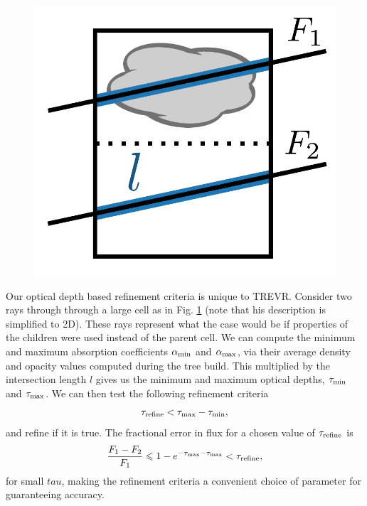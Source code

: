 \documentclass[fleq,usenatbib]{mnras}
\newcommand{\acro}{TREVR}
\begin{document}
\begin{figure}
\includegraphics[width=1\linewidth]{Figures/refine.pdf}
\caption{}
\label{fig:refine}
\end{figure}
Our optical depth based refinement criteria is unique to \acro. Consider two 
rays through through a large cell as in Fig. \ref{fig:refine} (note that his 
description is simplified to 2D). These rays represent what the case would be 
if properties of the children were used instead of the parent cell. We can 
compute the minimum and maximum absorption coefficients $\alpha_{\rm min}$ and 
$\alpha_{\rm max}$, via their average density and opacity values computed 
during the tree build. This multiplied by the intersection length $l$ gives us 
the minimum and maximum optical depths, $\tau_{\rm min}$ and $\tau_{\rm max}$. 
We can then test the following refinement criteria
\begin{equation}
\label{eq:refcrit}
\tau_{\rm refine} < \tau_{\rm max} - \tau_{\rm min},
\end{equation}
and refine if it is true. The fractional error in flux for a chosen value of 
$\tau_{\rm refine}$ is
\begin{equation}
\label{eq:reffrac}
\frac{F_1 - F_2}{F_1} \leq 1 - e^{-\tau_{\rm max}-\tau_{\rm max}} 
< \tau_{\rm refine},
\end{equation}
for small $tau$, making the refinement criteria a convenient choice of 
parameter for guaranteeing accuracy.
\end{document}
